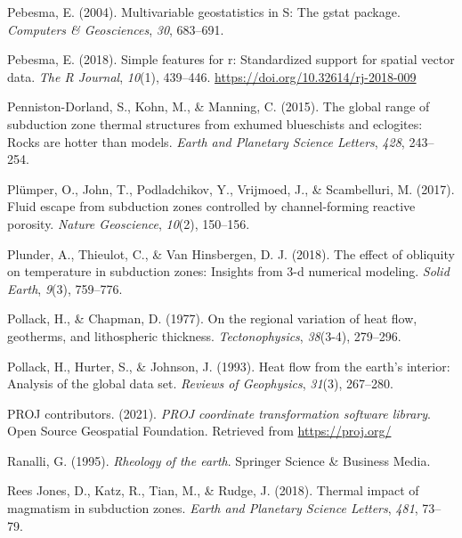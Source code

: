 \begin{CSLReferences}{1}{1}
\leavevmode{}%
Pebesma, E. (2004). Multivariable geostatistics in {S}: The gstat package. \emph{Computers \& Geosciences}, \emph{30}, 683--691.

\leavevmode{}%
Pebesma, E. (2018). Simple features for r: Standardized support for spatial vector data. \emph{The R Journal}, \emph{10}(1), 439--446. \url{https://doi.org/10.32614/rj-2018-009}

\leavevmode{}%
Penniston-Dorland, S., Kohn, M., \& Manning, C. (2015). The global range of subduction zone thermal structures from exhumed blueschists and eclogites: Rocks are hotter than models. \emph{Earth and Planetary Science Letters}, \emph{428}, 243--254.

\leavevmode{}%
Plümper, O., John, T., Podladchikov, Y., Vrijmoed, J., \& Scambelluri, M. (2017). Fluid escape from subduction zones controlled by channel-forming reactive porosity. \emph{Nature Geoscience}, \emph{10}(2), 150--156.

\leavevmode{}%
Plunder, A., Thieulot, C., \& Van Hinsbergen, D. J. (2018). The effect of obliquity on temperature in subduction zones: Insights from 3-d numerical modeling. \emph{Solid Earth}, \emph{9}(3), 759--776.

\leavevmode{}%
Pollack, H., \& Chapman, D. (1977). On the regional variation of heat flow, geotherms, and lithospheric thickness. \emph{Tectonophysics}, \emph{38}(3-4), 279--296.

\leavevmode{}%
Pollack, H., Hurter, S., \& Johnson, J. (1993). Heat flow from the earth's interior: Analysis of the global data set. \emph{Reviews of Geophysics}, \emph{31}(3), 267--280.

\leavevmode{}%
PROJ contributors. (2021). \emph{{PROJ} coordinate transformation software library}. Open Source Geospatial Foundation. Retrieved from \url{https://proj.org/}

\leavevmode{}%
Ranalli, G. (1995). \emph{Rheology of the earth}. Springer Science \& Business Media.

\leavevmode{}%
Rees Jones, D., Katz, R., Tian, M., \& Rudge, J. (2018). Thermal impact of magmatism in subduction zones. \emph{Earth and Planetary Science Letters}, \emph{481}, 73--79.


\end{CSLReferences}
